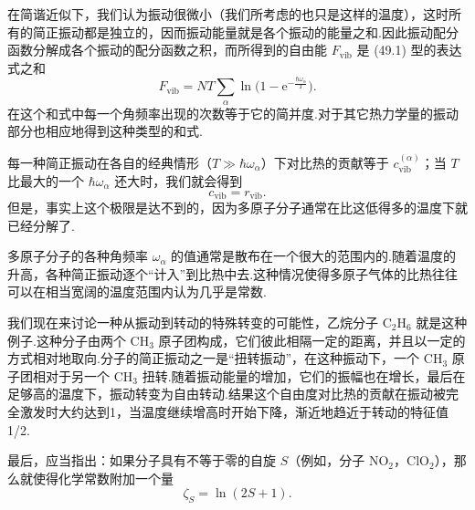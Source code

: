 在简谐近似下，我们认为振动很微小（我们所考虑的也只是这样的温度），这时所有的简正振动都是独立的，因而振动能量就是各个振动的能量之和.因此振动配分函数分解成各个振动的配分函数之积，而所得到的自由能 $F_{\mathrm{vib}}$ 是 (49.1) 型的表达式之和
\begin{equation}
  F_{\mathrm{vib}}=NT\sum_{\alpha}\ln\Big(1-\mathrm{e}^{-\frac{\hbar\omega_{\alpha}}{T}}\Big).
\end{equation}
在这个和式中每一个角频率出现的次数等于它的简并度.对于其它热力学量的振动部分也相应地得到这种类型的和式.

每一种简正振动在各自的经典情形（$T\gg\hbar\omega_{\alpha}$）下对比热的贡献等于 $c_{\mathrm{vib}}^{(\alpha)}$；当 $T$ 比最大的一个 $\hbar\omega_{\alpha}$ 还大时，我们就会得到
\begin{equation}
  c_{\mathrm{vib}}=r_{\mathrm{vib}}.
\end{equation}
但是，事实上这个极限是达不到的，因为多原子分子通常在比这低得多的温度下就已经分解了.

多原子分子的各种角频率 $\omega_{\alpha}$ 的值通常是散布在一个很大的范围内的.随着温度的升高，各种简正振动逐个“计入”到比热中去.这种情况使得多原子气体的比热往往可以在相当宽阔的温度范围内认为几乎是常数.

我们现在来讨论一种从振动到转动的特殊转变的可能性，乙烷分子 $\mathrm{C}_2\mathrm{H}_6$ 就是这种例子.这种分子由两个 $\mathrm{CH}_3$ 原子团构成，它们彼此相隔一定的距离，并且以一定的方式相对地取向.分子的简正振动之一是“扭转振动”，在这种振动下，一个 $\mathrm{CH}_3$ 原子团相对于另一个 $\mathrm{CH}_3$ 扭转.随着振动能量的增加，它们的振幅也在增长，最后在足够高的温度下，振动转变为自由转动.结果这个自由度对比热的贡献在振动被完全激发时大约达到1，当温度继续增高时开始下降，渐近地趋近于转动的特征值1/2.

最后，应当指出：如果分子具有不等于零的自旋 $S$（例如，分子 $\mathrm{NO}_2$，$\mathrm{ClO}_2$），那么就使得化学常数附加一个量
\begin{equation}
  \zeta_S=\ln\left(2S+1\right).
\end{equation}

